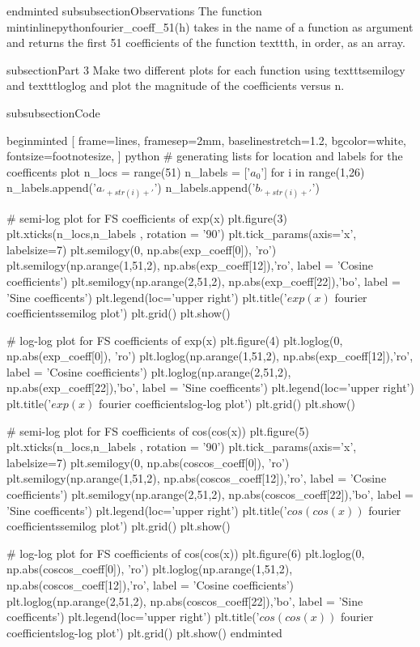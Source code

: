 end{minted}
subsubsection{Observations}
The function mintinline{python}{fourier_coeff_51(h)} takes in the name of a function as argument and returns the first 51 coefficients of the function texttt{h}, in order, as an array.

subsection{Part 3}
Make two  different  plots  for  each  function  using  texttt{semilogy}  and  texttt{loglog} and plot the magnitude of the coefficients versus n.

subsubsection{Code}

begin{minted}
[
frame=lines,
framesep=2mm,
baselinestretch=1.2,
bgcolor=white,
fontsize=footnotesize,
]
{python}
# generating lists for location and labels for the coefficents plot
n_locs = range(51)
n_labels = ['$a_0$']
for i in range(1,26)
    n_labels.append('$a_{'+str(i)+'}$')
    n_labels.append('$b_{'+str(i)+'}$') 

# semi-log plot for FS coefficients of exp(x)
plt.figure(3)
plt.xticks(n_locs,n_labels , rotation = '90')
plt.tick_params(axis='x', labelsize=7)
plt.semilogy(0, np.abs(exp_coeff[0]), 'ro')
plt.semilogy(np.arange(1,51,2), np.abs(exp_coeff[12]),'ro', label = 'Cosine coefficients')
plt.semilogy(np.arange(2,51,2), np.abs(exp_coeff[22]),'bo', label = 'Sine coefficents')
plt.legend(loc='upper right')
plt.title('$exp(x)$ fourier coefficientssemilog plot')
plt.grid()
plt.show()

# log-log plot for FS coefficients of exp(x)
plt.figure(4)
plt.loglog(0, np.abs(exp_coeff[0]), 'ro')
plt.loglog(np.arange(1,51,2), np.abs(exp_coeff[12]),'ro', label = 'Cosine coefficients')
plt.loglog(np.arange(2,51,2), np.abs(exp_coeff[22]),'bo', label = 'Sine coefficents')
plt.legend(loc='upper right')
plt.title('$exp(x)$ fourier coefficientslog-log plot')
plt.grid()
plt.show()

# semi-log plot for FS coefficients of cos(cos(x))
plt.figure(5)
plt.xticks(n_locs,n_labels , rotation = '90')
plt.tick_params(axis='x', labelsize=7)
plt.semilogy(0, np.abs(coscos_coeff[0]), 'ro')
plt.semilogy(np.arange(1,51,2), np.abs(coscos_coeff[12]),'ro', label = 'Cosine coefficients')
plt.semilogy(np.arange(2,51,2), np.abs(coscos_coeff[22]),'bo', label = 'Sine coefficents')
plt.legend(loc='upper right')
plt.title('$cos(cos(x))$ fourier coefficientssemilog plot')
plt.grid()
plt.show()

# log-log plot for FS coefficients of cos(cos(x))
plt.figure(6)
plt.loglog(0, np.abs(coscos_coeff[0]), 'ro')
plt.loglog(np.arange(1,51,2), np.abs(coscos_coeff[12]),'ro', label = 'Cosine coefficients')
plt.loglog(np.arange(2,51,2), np.abs(coscos_coeff[22]),'bo', label = 'Sine coefficents')
plt.legend(loc='upper right')
plt.title('$cos(cos(x))$ fourier coefficientslog-log plot')
plt.grid()
plt.show()
end{minted}

